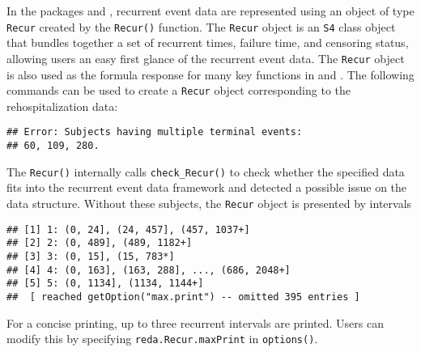 In the packages  and , recurrent event data are
represented using an object of type \texttt{Recur} created by the
\texttt{Recur()} function. The \texttt{Recur} object is an \texttt{S4}
class object that bundles together a set of recurrent times, failure
time, and censoring status, allowing users an easy first glance of the
recurrent event data. The \texttt{Recur} object is also used as the
formula response for many key functions in  and .
The following commands can be used to create a \texttt{Recur} object
corresponding to the rehospitalization data:

\begin{Shaded}
\begin{Highlighting}[]
 \NormalTok{)}
\end{Highlighting}
\end{Shaded}

\begin{verbatim}
## Error: Subjects having multiple terminal events:
## 60, 109, 280.
\end{verbatim}

The \texttt{Recur()} internally calls \texttt{check\_Recur()} to check
whether the specified data fits into the recurrent event data framework
and detected a possible issue on the data structure. Without these
subjects, the \texttt{Recur} object is presented by intervals

\begin{Shaded}
\end{Shaded}

\begin{verbatim}
## [1] 1: (0, 24], (24, 457], (457, 1037+]       
## [2] 2: (0, 489], (489, 1182+]                 
## [3] 3: (0, 15], (15, 783*]                    
## [4] 4: (0, 163], (163, 288], ..., (686, 2048+]
## [5] 5: (0, 1134], (1134, 1144+]               
##  [ reached getOption("max.print") -- omitted 395 entries ]
\end{verbatim}

For a concise printing, up to three recurrent intervals are printed.
Users can modify this by specifying \texttt{reda.Recur.maxPrint} in
\texttt{options()}.
